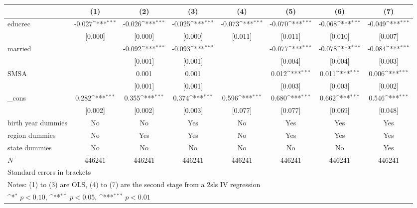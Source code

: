 {
\def\sym#1{\ifmmode^{#1}\else\(^{#1}\)\fi}
\begin{longtable}{l*{7}{c}}
\hline\hline\endfirsthead\hline\endhead\hline\endfoot\endlastfoot
          &\multicolumn{1}{c}{(1)}         &\multicolumn{1}{c}{(2)}         &\multicolumn{1}{c}{(3)}         &\multicolumn{1}{c}{(4)}         &\multicolumn{1}{c}{(5)}         &\multicolumn{1}{c}{(6)}         &\multicolumn{1}{c}{(7)}         \\
\hline
educrec   &   -0.027\sym{***}&   -0.026\sym{***}&   -0.025\sym{***}&   -0.073\sym{***}&   -0.070\sym{***}&   -0.068\sym{***}&   -0.049\sym{***}\\
          &  [0.000]         &  [0.000]         &  [0.000]         &  [0.011]         &  [0.011]         &  [0.010]         &  [0.007]         \\
[1em]
married   &                  &   -0.092\sym{***}&   -0.093\sym{***}&                  &   -0.077\sym{***}&   -0.078\sym{***}&   -0.084\sym{***}\\
          &                  &  [0.001]         &  [0.001]         &                  &  [0.004]         &  [0.004]         &  [0.003]         \\
[1em]
SMSA      &                  &    0.001         &    0.001         &                  &    0.012\sym{***}&    0.011\sym{***}&    0.006\sym{***}\\
          &                  &  [0.001]         &  [0.001]         &                  &  [0.003]         &  [0.003]         &  [0.002]         \\
[1em]
\_cons    &    0.282\sym{***}&    0.355\sym{***}&    0.374\sym{***}&    0.596\sym{***}&    0.680\sym{***}&    0.662\sym{***}&    0.546\sym{***}\\
          &  [0.002]         &  [0.002]         &  [0.003]         &  [0.077]         &  [0.077]         &  [0.069]         &  [0.048]         \\
[1em]
birth year dummies &       No         &       No         &      Yes         &       No         &      Yes         &      Yes         &      Yes         \\
[1em]
region dummies &       No         &      Yes         &      Yes         &       No         &      Yes         &      Yes         &      Yes         \\
[1em]
state dummies &       No         &       No         &       No         &       No         &       No         &       No         &      Yes         \\
\hline
\(N\)     &   446241         &   446241         &   446241         &   446241         &   446241         &   446241         &   446241         \\
\hline\hline
\multicolumn{8}{l}{\footnotesize Standard errors in brackets}\\
\multicolumn{8}{l}{\footnotesize Notes: (1) to (3) are OLS, (4) to (7) are the second stage from a 2sls IV regression}\\
\multicolumn{8}{l}{\footnotesize \sym{*} \(p<0.10\), \sym{**} \(p<0.05\), \sym{***} \(p<0.01\)}\\
\end{longtable}
}
